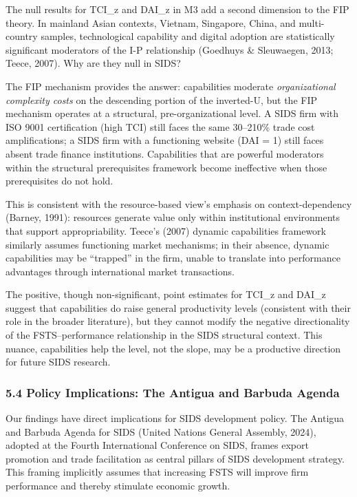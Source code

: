 \documentclass[
  12pt,a4paper]{article}
\begin{document}
The null results for TCI\_z and DAI\_z in M3 add a second dimension to
the FIP theory. In mainland Asian contexts, Vietnam, Singapore, China,
and multi-country samples, technological capability and digital adoption
are statistically significant moderators of the I-P relationship
(Goedhuys \& Sleuwaegen, 2013; Teece, 2007). Why are they null in SIDS?

The FIP mechanism provides the answer: capabilities moderate
\emph{organizational complexity costs} on the descending portion of the
inverted-U, but the FIP mechanism operates at a structural,
pre-organizational level. A SIDS firm with ISO 9001 certification (high
TCI) still faces the same 30--210\% trade cost amplifications; a SIDS
firm with a functioning website (DAI = 1) still faces absent trade
finance institutions. Capabilities that are powerful moderators within
the structural prerequisites framework become ineffective when those
prerequisites do not hold.

This is consistent with the resource-based view's emphasis on
context-dependency (Barney, 1991): resources generate value only within
institutional environments that support appropriability. Teece's (2007)
dynamic capabilities framework similarly assumes functioning market
mechanisms; in their absence, dynamic capabilities may be ``trapped'' in
the firm, unable to translate into performance advantages through
international market transactions.

The positive, though non-significant, point estimates for TCI\_z and
DAI\_z suggest that capabilities do raise general productivity levels
(consistent with their role in the broader literature), but they cannot
modify the negative directionality of the FSTS--performance relationship
in the SIDS structural context. This nuance, capabilities help the
level, not the slope, may be a productive direction for future SIDS
research.

\hypertarget{policy-implications-the-antigua-and-barbuda-agenda}{%
\subsubsection{5.4 Policy Implications: The Antigua and Barbuda
Agenda}\label{policy-implications-the-antigua-and-barbuda-agenda}}

Our findings have direct implications for SIDS development policy. The
Antigua and Barbuda Agenda for SIDS (United Nations General Assembly,
2024), adopted at the Fourth International Conference on SIDS, frames
export promotion and trade facilitation as central pillars of SIDS
development strategy. This framing implicitly assumes that increasing
FSTS will improve firm performance and thereby stimulate economic
growth.
\end{document}
